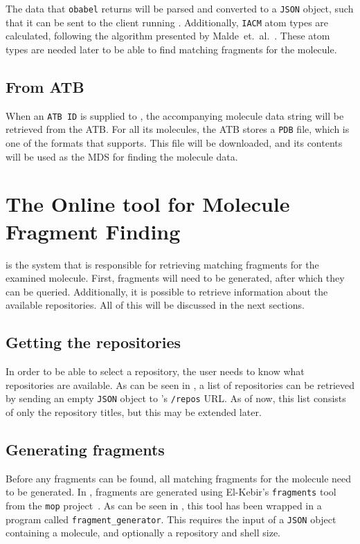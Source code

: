The data that \verb|obabel| returns will be parsed and converted to a \verb|JSON| object, such that it can be sent to the client running \oframp. Additionally, \verb|IACM| atom types are calculated, following the algorithm presented by Malde~et.~al.~\cite{malde2011automated}. These atom types are needed later to be able to find matching fragments for the molecule.


\subsection{From ATB}
When an \verb|ATB ID| is supplied to \oapoc, the accompanying molecule data string will be retrieved from the ATB. For all its molecules, the ATB stores a \verb|PDB| file, which is one of the formats that \oapoc{} supports. This file will be downloaded, and its contents will be used as the MDS for finding the molecule data.



\section[\omfraf]{The Online tool for Molecule Fragment Finding}
\omfraf{} is the system that is responsible for retrieving matching fragments for the examined molecule. First, fragments will need to be generated, after which they can be queried. Additionally, it is possible to retrieve information about the available repositories. All of this will be discussed in the next sections.

\subsection{Getting the repositories}
In order to be able to select a repository, the user needs to know what repositories are available. As can be seen in , a list of repositories can be retrieved by sending an empty \verb|JSON| object to \omfraf's \verb|/repos| URL. As of now, this list consists of only the repository titles, but this may be extended later.

\subsection{Generating fragments}
Before any fragments can be found, all matching fragments for the molecule need to be generated. In \omfraf, fragments are generated using El-Kebir's \verb|fragments| tool from the \verb|mop| project~\cite{elkebir2014molecule}. As can be seen in , this tool has been wrapped in a program called \verb|fragment_generator|. This requires the input of a \verb|JSON| object containing a molecule, and optionally a repository and shell size.

